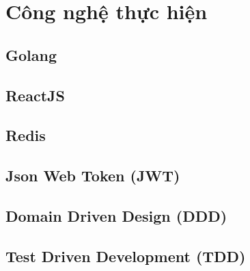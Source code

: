 \section{Công nghệ thực hiện}

\subsection{Golang}

\subsection{ReactJS}

\subsection{Redis}

\subsection{Json Web Token (JWT)}

\subsection{Domain Driven Design (DDD)}

\subsection{Test Driven Development (TDD)}
